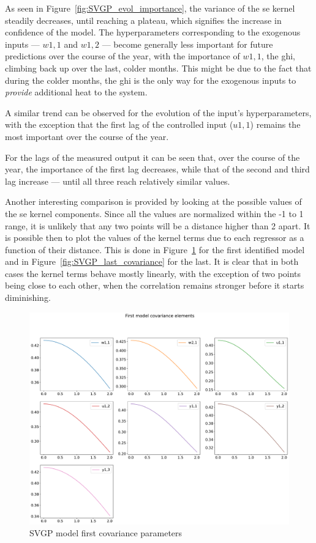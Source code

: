 As seen in Figure~\ref{fig:SVGP_evol_importance}, the variance of the
\acrshort{se} kernel steadily decreases, until reaching a plateau, which
signifies the increase in confidence of the model. The hyperparameters
corresponding to the exogenous inputs --- $w1,1$ and $w1,2$ --- become generally
less important for future predictions over the course of the year, with the
importance of $w1,1$, the \acrshort{ghi}, climbing back up over the last, colder
months. This might be due to the fact that during the colder months, the
\acrshort{ghi} is the only way for the exogenous inputs to \textit{provide}
additional heat to the system.

A similar trend can be observed for the evolution of the input's
hyperparameters, with the exception that the first lag of the controlled input
($u1,1$) remains the most important over the course of the year.

For the lags of the measured output it can be seen that, over the course of the
year, the importance of the first lag decreases, while that of the second and
third lag increase --- until all three reach relatively similar values.

Another interesting comparison is provided by looking at the possible values of
the \acrshort{se} kernel components. Since all the values are normalized within
the -1 to 1 range, it is unlikely that any two points will be a distance higher
than 2 apart. It is possible then to plot the values of the kernel terms due to
each regressor as a function of their distance. This is done in
Figure~\ref{fig:SVGP_first_covariance} for the first identified model and in
Figure~\ref{fig:SVGP_last_covariance} for the last. It is clear that in both
cases the kernel terms behave mostly linearly, with the exception of two points
being close to each other, when the correlation remains stronger before it
starts diminishing.

\begin{figure}[ht]
    \centering
    \includegraphics[width =
    \textwidth]{Plots/1_SVGP_480pts_inf_window_12_averageYear_first_covariance.pdf}
    \caption{SVGP model first covariance parameters}
    \label{fig:SVGP_first_covariance}
\end{figure}

